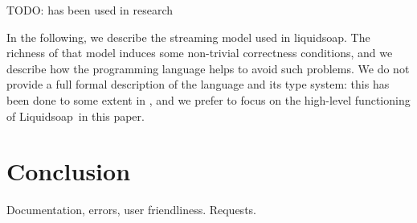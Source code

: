 \documentclass{llncs}
\newcommand{\liquidsoap}{Liquidsoap}
\begin{document}
TODO: has been used in research~\cite{baccigalupo2007case,baccigalupo2007sharing}

In the following, we describe the streaming model used in liquidsoap.
The richness of that model induces some non-trivial correctness conditions,
and we describe how the programming language helps to avoid such
problems.
We do not provide a full formal description of the language and its
type system: this has been done to some extent in 
\cite{baelde-mimram:webradio-lambda}, and we prefer to focus on the
high-level functioning of \liquidsoap\ in this paper.

\section{Conclusion}

Documentation, errors, user friendliness.
Requests.



\end{document}
